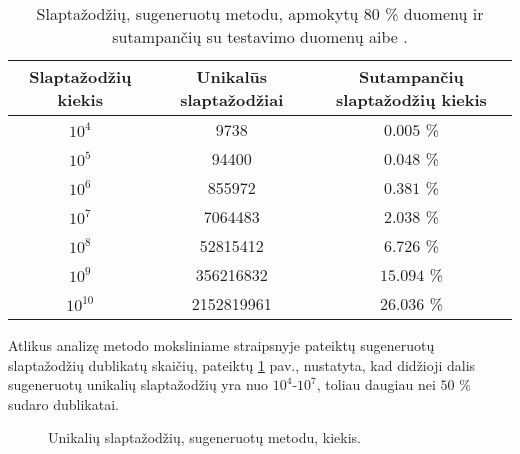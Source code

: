 \documentclass{VUMIFInfBakalaurinis}
\begin{document}
\begin{table}[hb]
  \centering
  \caption{%
    Slaptažodžių, sugeneruotų  metodu, apmokytų $80$ \% 
     duomenų ir sutampančių su  testavimo 
    duomenų aibe \cite{PassGAN}.
  }
  \begin{tabular}{|c|c|c|}
    \hline \textbf{Slaptažodžių kiekis} & \textbf{Unikalūs slaptažodžiai} & 
    \textbf{Sutampančių slaptažodžių kiekis} \\
    \hline $10^4$ & 9738 & $0.005$ \% \\
    \hline $10^5$ & 94400 & $0.048$ \% \\
    \hline $10^6$ & 855972 & $0.381$ \% \\
    \hline $10^7$ & 7064483 & $2.038$ \% \\
    \hline $10^8$ & 52815412 & $6.726$ \% \\
    \hline $10^9$ & 356216832 & $15.094$ \% \\
    \hline $10^{10}$ & 2152819961 & $26.036$ \% \\
    \hline
  \end{tabular}
  \label{tab:passgan-original-results}
\end{table}

Atlikus analizę  metodo moksliniame straipsnyje pateiktų 
sugeneruotų slaptažodžių dublikatų skaičių, pateiktų
\ref{plot:passgan-original-duplicates} pav., nustatyta, kad didžioji dalis 
sugeneruotų unikalių slaptažodžių yra nuo $10^4$-$10^7$, toliau daugiau nei $50$ 
\% sudaro dublikatai.

\begin{figure}[!ht]
  \begin{center}
  \end{center}
  \caption{%
    Unikalių slaptažodžių, sugeneruotų  metodu, kiekis.
  }
  \label{plot:passgan-original-duplicates}
\end{figure}
\end{document}
